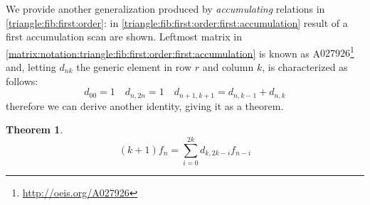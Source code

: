 \documentclass[a4paper,dottedtoc,headinclude,footinclude]{report} %
\theoremstyle{plain}
\newtheorem{thm}{Theorem}[section]
\begin{document}
    We provide another generalization produced by \emph{accumulating}
    relations in \autoref{triangle:fib:first:order}: in 
    \autoref{triangle:fib:first:order:first:accumulation} result of a first
    accumulation scan are shown. Leftmost matrix in 
    \autoref{matrix:notation:triangle:fib:first:order:first:accumulation}
    is known as A$027926$\footnote{\url{http://oeis.org/A027926}} and, 
    letting $d_{nk}$ the generic element in row $r$ and column $k$, is
    characterized as follows:
    \begin{displaymath}
        d_{00} = 1 \quad d_{n, 2n} = 1 \quad d_{n+1,k+1} = d_{n, k-1} + d_{n, k}  
    \end{displaymath}
    therefore we can derive another identity, giving it as a theorem.

    \begin{thm}
        \begin{displaymath}
            \left(k + 1\right) f_{n} = \sum_{i=0}^{2 k}  d_{k,2 k - i} f_{n - i}
        \end{displaymath}
    \end{thm}
\end{document}
